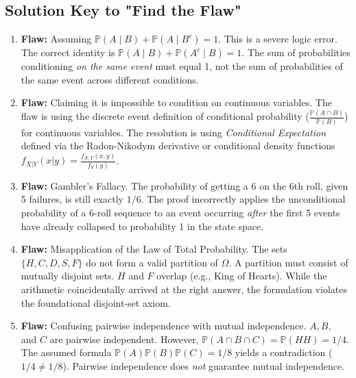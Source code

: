 \documentclass[11pt, letterpaper]{article}
\theoremstyle{definition}
\renewcommand{\P}{\mathbb{P}}
\begin{document}
\vspace{1cm}
\subsection*{Solution Key to "Find the Flaw"}
\begin{enumerate}
    \item \textbf{Flaw:} Assuming $\P(A \mid B) + \P(A \mid B^c) = 1$. This is a severe logic error. The correct identity is $\P(A \mid B) + \P(A^c \mid B) = 1$. The sum of probabilities conditioning \textit{on the same event} must equal 1, not the sum of probabilities of the same event across different conditions.
    \item \textbf{Flaw:} Claiming it is impossible to condition on continuous variables. The flaw is using the discrete event definition of conditional probability ($\frac{\P(A \cap B)}{\P(B)}$) for continuous variables. The resolution is using \textit{Conditional Expectation} defined via the Radon-Nikodym derivative or conditional density functions $f_{X|Y}(x|y) = \frac{f_{X,Y}(x,y)}{f_Y(y)}$.
    \item \textbf{Flaw:} Gambler's Fallacy. The probability of getting a 6 on the 6th roll, given 5 failures, is still exactly $1/6$. The proof incorrectly applies the unconditional probability of a 6-roll sequence to an event occurring \textit{after} the first 5 events have already collapsed to probability 1 in the state space.
    \item \textbf{Flaw:} Misapplication of the Law of Total Probability. The sets $\{H, C, D, S, F\}$ do not form a valid partition of $\Omega$. A partition must consist of mutually disjoint sets. $H$ and $F$ overlap (e.g., King of Hearts). While the arithmetic coincidentally arrived at the right answer, the formulation violates the foundational disjoint-set axiom.
    \item \textbf{Flaw:} Confusing pairwise independence with mutual independence. $A, B,$ and $C$ are pairwise independent. However, $\P(A \cap B \cap C) = \P(HH) = 1/4$. The assumed formula $\P(A)\P(B)\P(C) = 1/8$ yields a contradiction ($1/4 \neq 1/8$). Pairwise independence does \textit{not} guarantee mutual independence.
\end{enumerate}
\end{document}
